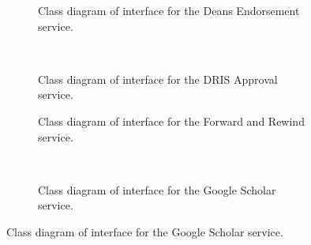 \documentclass[12pt]{article}
\begin{document}
\begin{figure}[p]
\begin{subfigure}[p]{0.47\textwidth}
\centering	
{}
\caption{Class diagram of interface for the Deans Endorsement service.}
\end{subfigure}
~
\begin{subfigure}[p]{0.47\textwidth}
\centering	
{}
\caption{Class diagram of interface for the DRIS Approval service.}
\end{subfigure}

\begin{subfigure}[p]{0.47\textwidth}
\centering	
{}
\caption{Class diagram of interface for the Forward and Rewind service.}
\end{subfigure}
~
\begin{subfigure}[p]{0.47\textwidth}
\centering	
{}
\caption{Class diagram of interface for the Google Scholar service.}
\end{subfigure}
\end{figure}
\end{document}
